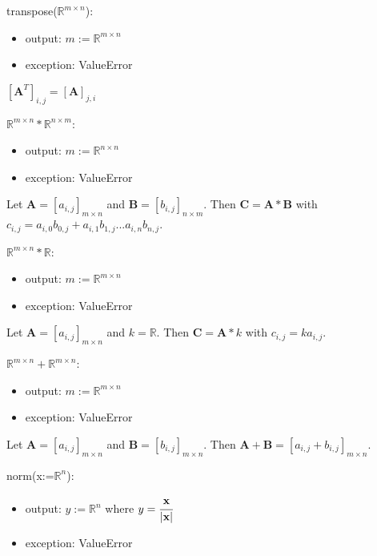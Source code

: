 \documentclass[12pt, titlepage]{article}
\begin{document}
\noindent transpose($\mathbb{R}^{m \times n}$):
\begin{itemize}
\item output: $m:=\mathbb{R}^{m \times n}$
\item exception: ValueError
\end{itemize}

$[\mathbf{A}^T]_{i,j} = [\mathbf{A}]_{j,i}$
\newline

\noindent $\mathbb{R}^{m \times n} * \mathbb{R}^{n \times m}$:
\begin{itemize}
\item output: $m:=\mathbb{R}^{n \times n}$
\item exception: ValueError
\end{itemize}

Let $\mathbf{A} = [a_{i,j}]_{m\times n}$ and $\mathbf{B} = [b_{i,j}]_{n\times m}$. Then $\mathbf{C}
= \mathbf{A} * \mathbf{B}$ with $c_{i,j} = a_{i,0} b_{0,j} + a_{i,1} b_{1,j} ...  a_{i,n}b_{n,j}$.
\newline

\noindent $\mathbb{R}^{m \times n} * \mathbb{R}$:
\begin{itemize}
\item output: $m:=\mathbb{R}^{m \times n}$
\item exception: ValueError
\end{itemize}

Let $\mathbf{A} = [a_{i,j}]_{m\times n}$ and $k = \mathbb{R}$. Then $\mathbf{C} = \mathbf{A} * k$
with $c_{i,j} = k a_{i,j}$.
\newline

\noindent $\mathbb{R}^{m \times n} + \mathbb{R}^{m \times n}$:
\begin{itemize}
\item output: $m:=\mathbb{R}^{m \times n}$
\item exception: ValueError
\end{itemize}

Let $\mathbf{A} = [a_{i,j}]_{m \times n}$ and $\mathbf{B} = [b_{i,j}]_{m \times n}$. Then
$\mathbf{A} + \mathbf{B} = [a_{i,j} + b_{i,j}]_{m \times n}$.
\newline

\noindent norm(x:=$\mathbb{R}^{n}$):
\begin{itemize}
\item output: $y:=\mathbb{R}^{n}$ where $y = \cfrac{\mathbf{x}}{|\mathbf{x}|}$
\item exception: ValueError
\end{itemize}
\end{document}
